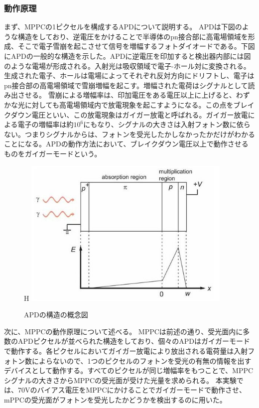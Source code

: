 \subsubsection{動作原理}
まず、MPPCの1ピクセルを構成するAPDについて説明する。
APDは下図のような構造をしており、逆電圧をかけることで半導体のpn接合部に高電場領域を形成、そこで電子雪崩を起こさせて信号を増幅するフォトダイオードである。下図にAPDの一般的な構造を示した。APDに逆電圧を印加すると検出器内部には図のような電場が形成される。入射光は吸収領域で電子-ホール対に変換される。生成された電子、ホールは電場によってそれぞれ反対方向にドリフトし、電子はpn接合部の高電場領域で雪崩増幅を起こす。増幅された電荷はシグナルとして読み出させる。
雪崩による増幅率は、印加電圧をある電圧以上に上げると、わずかな光に対しても高電場領域内で放電現象を起こすようになる。この点をブレイクダウン電圧といい、この放電現象はガイガー放電と呼ばれる。ガイガー放電による電子の増幅率は約$10^6$にもなり、シグナルの大きさは入射フォトン数に依らない。つまりシグナルからは、フォトンを受光したかしなかったかだけがわかることになる。APDの動作方法において、ブレイクダウン電圧以上で動作させるものをガイガーモードという。
\begin{figure}{H}
 \centering
 \includegraphics[width=100mm,bb=0 0 ]{MPPC1.jpg}
 \caption{APDの構造の概念図}
\end{figure}
次に、MPPCの動作原理について述べる。
MPPCは前述の通り、受光面内に多数のAPDピクセルが並べられた構造をしており、個々のAPDはガイガーモードで動作する。各ピクセルにおいてガイガー放電により放出される電荷量は入射フォトン数によらないので、1つのピクセルのフォトンを受光の有無の情報を出すデバイスとして動作する。すべてのピクセルが同じ増幅率をもつことで、MPPCシグナルの大きさからMPPCの受光面が受けた光量を求められる。
本実験では、70Vのバイアス電圧をMPPCにかけることでガイガーモードで動作させ、mPPCの受光面がフォトンを受光したかどうかを検出するのに用いた。
